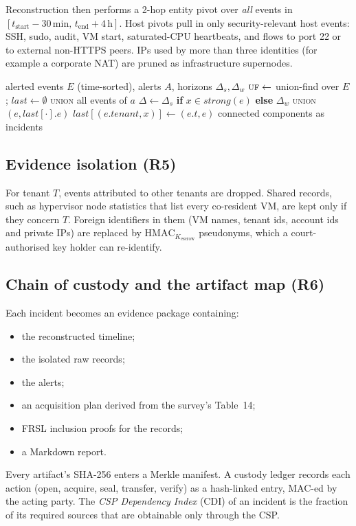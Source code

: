 \documentclass[conference,10pt]{IEEEtran}
\begin{document}
Reconstruction then performs a 2-hop entity pivot over \emph{all} events in $[t_{\text{start}}-30\,\text{min},\, t_{\text{end}}+4\,\text{h}]$. Host pivots pull in only security-relevant host events: SSH, sudo, audit, VM start, saturated-CPU heartbeats, and flows to port 22 or to external non-HTTPS peers. IPs used by more than three identities (for example a corporate NAT) are pruned as infrastructure supernodes.

\begin{algorithm}[t]
\caption{Entity-graph correlation}
\label{alg:eg}
\footnotesize
\begin{algorithmic}[1]
\Require alerted events $E$ (time-sorted), alerts $A$, horizons $\Delta_s,\Delta_w$
\State $\textsc{uf}\gets$ union-find over $E$;\; $\textit{last}\gets\emptyset$
 \textsc{union} all events of $a$ \EndFor
{}
     \State $\Delta\gets\Delta_s$ \textbf{if} $x\in\textit{strong}(e)$ \textbf{else} $\Delta_w$
        \State \textsc{union}$(e, \textit{last}[\cdot].e)$
     \EndIf
     \State $\textit{last}[(e.\textit{tenant},x)]\gets(e.t,e)$
  \EndFor
\EndFor
\State \Return connected components as incidents
\end{algorithmic}
\end{algorithm}

\subsection{Evidence isolation (R5)}
For tenant $T$, events attributed to other tenants are dropped. Shared records, such as hypervisor node statistics that list every co-resident VM, are kept only if they concern $T$. Foreign identifiers in them (VM names, tenant ids, account ids and private IPs) are replaced by $\mathrm{HMAC}_{K_{\text{escrow}}}$ pseudonyms, which a court-authorised key holder can re-identify.

\subsection{Chain of custody and the artifact map (R6)}
Each incident becomes an evidence package containing:
\begin{itemize}
\item the reconstructed timeline;
\item the isolated raw records;
\item the alerts;
\item an acquisition plan derived from the survey's Table~14;
\item FRSL inclusion proofs for the records;
\item a Markdown report.
\end{itemize}
Every artifact's SHA-256 enters a Merkle manifest. A custody ledger records each action (open, acquire, seal, transfer, verify) as a hash-linked entry, MAC-ed by the acting party. The \emph{CSP Dependency Index} (CDI) of an incident is the fraction of its required sources that are obtainable only through the CSP.
\end{document}
